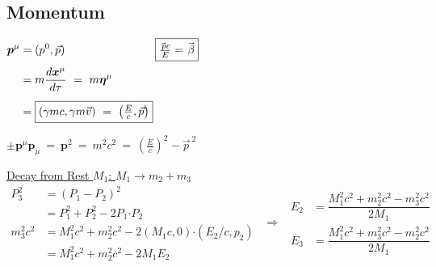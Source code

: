 \documentclass[12pt]{article}
\newcommand{\hs}{\hspace{1pt}} %
\newcommand{\hsvec}[1]{\vec{\hs #1}} %
\newcommand{\dotP}{\boldsymbol \cdot}		%
\newcommand{\contra}[1]{\boldsymbol {#1}^{\mu}}	%
\newcommand{\covar}[1]{\boldsymbol {#1}_{\mu}}		%
\begin{document}
\vspace{15pt}

\subsection{Momentum}
\vspace{-5pt}
\hfill
\(
	\begin{aligned}[t]
		\contra{p} & = (p^0, \vec{p}) \\[5pt]
			& = m\frac{d\contra{x}}{d\tau} \ =\  m \contra{\eta} \\[5pt]
			& = \boxed{ (\gamma mc, \gamma m\vec{v}) \ =\  \left( \tfrac{E}{c}, \vec{p} \right) }
	\end{aligned}
	\hspace{2pt}
	\begin{aligned}[t]
		\Aboxed{ \tfrac{\hsvec{p}c}{E} & = \hsvec{\beta} }
	\end{aligned}
\)
\hfill
\begin{minipage}[t]{0.49\textwidth}
	\(\pm \contra{p}\covar{p} \ =\ \boxed{ {\boldsymbol{p}}^2 \ =\ m^2c^2 \ =\  \left( \tfrac{E}{c} \right)^2 - \vec{p}^{\ 2}}\)

	\vspace{20pt}
\end{minipage}

\vspace{20pt}
\indent \underline{Decay from Rest \(M_1\): \(M_1 \rightarrow m_2 + m_3\)}\\[10pt]
\indent \(\begin{aligned}
	P_3^2 &= (P_1 - P_2)^2 \\[5pt]
	& = P_1^2 + P_2^2 - 2 P_1 \dotP P_2\\[5pt]
	m_3^2c^2 & = M_1^2c^2 + m_2^2c^2 - 2 (M_1 c,0) \dotP (E_2/c,p_2)\\[5pt]
	& = M_1^2c^2 + m_2^2c^2 - 2 M_1 E_2
\end{aligned} \ \ \Rightarrow \ \
\boxed{ \begin{aligned}
	E_2 & = \dfrac{M_1^2c^2 + m_2^2c^2 - m_3^2c^2 }{2M_1}\\[5pt]
	E_3 & = \dfrac{M_1^2c^2 + m_3^2c^2 - m_2^2c^2 }{2M_1}
\end{aligned} }\)
\end{document}
